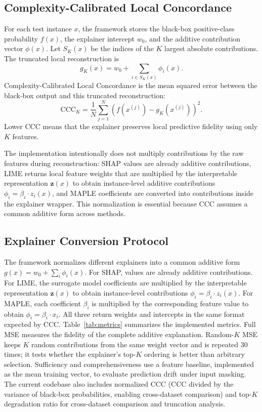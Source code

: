 \documentclass[sigconf,nonacm]{acmart}
\begin{document}
\subsection{Complexity-Calibrated Local Concordance}
For each test instance $x$, the framework stores the black-box positive-class
probability $f(x)$, the explainer intercept $w_0$, and the additive
contribution vector $\phi(x)$. Let $S_K(x)$ be the indices of the $K$ largest
absolute contributions. The truncated local reconstruction is
\begin{equation}
  g_K(x) = w_0 + \sum_{i \in S_K(x)} \phi_i(x).
\end{equation}
Complexity-Calibrated Local Concordance is the mean squared error between the
black-box output and this truncated reconstruction:
\begin{equation}
  \mathrm{CCC}_K =
  \frac{1}{N}\sum_{j=1}^{N}\left(f(x^{(j)}) - g_K(x^{(j)})\right)^2.
\end{equation}
Lower CCC means that the explainer preserves local predictive fidelity using
only $K$ features.

The implementation intentionally does not multiply contributions by the raw
features during reconstruction: SHAP values are already additive
contributions, LIME returns local feature weights that are multiplied by the
interpretable representation $\mathbf{z}(x)$ to obtain instance-level additive
contributions $\phi_i = \beta_i \cdot z_i(x)$, and MAPLE coefficients are
converted into contributions inside the explainer wrapper. This normalization is
essential because CCC assumes a common additive form across methods.

\subsection{Explainer Conversion Protocol}
The framework normalizes different explainers into a common additive form
$g(x)=w_0+\sum_i \phi_i(x)$. For SHAP, values are already additive contributions.
For LIME, the surrogate model coefficients are multiplied by the interpretable
representation $\mathbf{z}(x)$ to obtain instance-level contributions
$\phi_i = \beta_i \cdot z_i(x)$. For MAPLE, each coefficient $\beta_i$ is
multiplied by the corresponding feature value to obtain $\phi_i = \beta_i \cdot x_i$.
All three return weights and intercepts in the same format expected by CCC.
Table~\ref{tab:metrics} summarizes the implemented metrics. Full MSE measures
the fidelity of the complete additive explanation. Random-$K$ MSE keeps $K$
random contributions from the same weight vector and is repeated 30 times; it
tests whether the explainer's top-$K$ ordering is better than arbitrary
selection. Sufficiency and comprehensiveness use a feature baseline, implemented
as the mean training vector, to evaluate prediction drift under input masking.
The current codebase also includes normalized CCC (CCC divided by the variance
of black-box probabilities, enabling cross-dataset comparison) and top-$K$
degradation ratio for cross-dataset comparison and truncation analysis.
\end{document}
